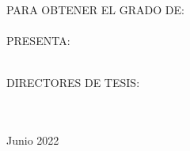 \begin{titlepage}
\begin{minipage}[c][0.81\textheight][t]{0.75\textwidth}
\begin{center}
                \vspace{2cm}            

                \textsc{\large PARA OBTENER EL GRADO DE:}\\[0.5cm]
                \textsc{\large \degreename}\\[0.5cm]
                \textsc{\large PRESENTA:}\\[0.5cm]
                {\large {\authorname}}\\[2cm]          

                \vspace{0.5cm}

                {\large DIRECTORES DE TESIS:\\[0.3cm] {\supname} \\[0.3cm] {\cosupname} }\\[.2in]

                \vspace{0.5cm}

                \large{\addressname \hspace{5cm}Junio 2022}{ }{}
            \end{center}
        \end{minipage}
    \end{titlepage}
